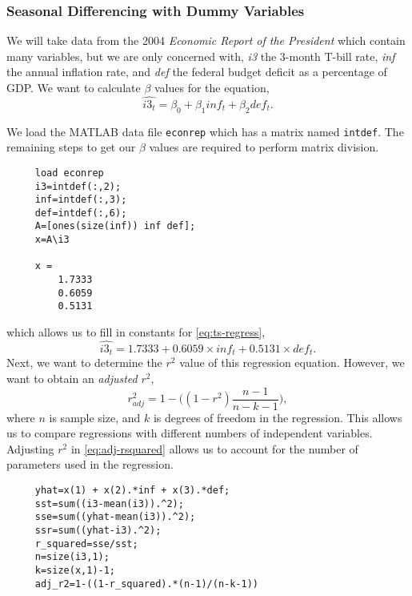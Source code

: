 \subsubsection{Seasonal Differencing with Dummy Variables}\label{perform-ts}
We will take data from the 2004 \emph{Economic Report of the President} which contain many variables, but we are only concerned with, \textit{i3} the 3-month T-bill rate, \textit{inf} the annual inflation rate, and \textit{def} the federal budget deficit as a percentage of GDP. We want to calculate $\beta$ values for the equation,
\begin{equation}
\widehat{i3_t} = \beta_0 + \beta_1 inf_t + \beta_2 def_t.
\label{eq:ts-regress}
\end{equation}

We load the MATLAB data file \texttt{econrep} which has a matrix named \texttt{intdef}. The remaining steps to get our $\beta$ values are required to perform matrix division.

\begin{verbatim}
     load econrep
     i3=intdef(:,2);
     inf=intdef(:,3);
     def=intdef(:,6);
     A=[ones(size(inf)) inf def];
     x=A\i3
     
     x =
         1.7333
         0.6059
         0.5131
\end{verbatim}

which allows us to fill in constants for \eqref{eq:ts-regress},
\[
\widehat{i3_t} = 1.7333 + 0.6059 \times inf_t + 0.5131 \times def_t.
\]
Next, we want to determine the $r^2$ value of this regression equation. However, we want to obtain an \emph{adjusted} $r^2$,
\begin{equation}
r^2_{adj} = 1- \Big( (1-r^2)\frac{n-1}{n-k-1} \Big),
\label{eq:adj-rsquared}
\end{equation}
where $n$ is sample size, and $k$ is degrees of freedom in the regression. This allows us to compare regressions with different numbers of independent variables. Adjusting $r^2$ in \eqref{eq:adj-rsquared} allows us to account for the number of parameters used in the regression.

\begin{verbatim}
     yhat=x(1) + x(2).*inf + x(3).*def;
     sst=sum((i3-mean(i3)).^2);
     sse=sum((yhat-mean(i3)).^2);
     ssr=sum((yhat-i3).^2);
     r_squared=sse/sst;
     n=size(i3,1);
     k=size(x,1)-1;
     adj_r2=1-((1-r_squared).*(n-1)/(n-k-1))
\end{verbatim}

